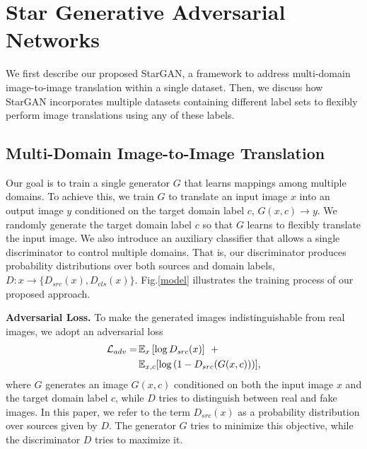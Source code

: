 \documentclass[10pt,twocolumn,letterpaper]{article}
\begin{document}
\section{Star Generative Adversarial Networks} \label{stargan}

We first describe our proposed StarGAN, a framework to address multi-domain image-to-image translation within a single dataset. Then, we discuss how StarGAN  incorporates multiple datasets containing different label sets to flexibly perform image translations using any of these labels. 
\subsection{Multi-Domain Image-to-Image Translation} 
Our goal is to train a single generator $G$ that learns mappings among multiple domains. To achieve this, we train $G$ to translate an input image $x$  into an output image $y$ conditioned on the target domain label $c$, $G(x, c) \rightarrow y$. 
We randomly generate the target domain label $c$ so that $G$ learns to flexibly translate the input image. We also introduce an auxiliary classifier \cite{odena2016conditional} that allows a single discriminator to control multiple domains. That is,  our discriminator produces probability distributions over both sources and domain labels, $D: x \rightarrow \{{D}_{src}(x), {D}_{cls}(x)\}$. Fig.\thinspace\ref{model} illustrates the training process of our proposed approach.


\medskip

\noindent \textbf{Adversarial Loss.} To make the generated images indistinguishable from real images, we adopt an adversarial loss
\begin{equation}
\begin{split}
 \mathcal{L}_{adv} = & \thinspace {\mathbb{E}}_{x} \left[ \log{{D}_{src}(x)} \right]  \> \>  +   \\
 & \thinspace {\mathbb{E}}_{x, c}[\log{(1 - {D}_{src}(G(x, c)))}],
\end{split}
\label{eq1}
\end{equation}
\noindent where $G$ generates an image $G(x, c)$ conditioned on both the input image $x$ and the target domain label $c$, while $D$ tries to distinguish between real and fake images. In this paper, we refer to the term ${D}_{src}(x)$ as a probability distribution over sources given by $D$. The generator $G$ tries to minimize this objective, while the discriminator $D$ tries to maximize it.
\end{document}

